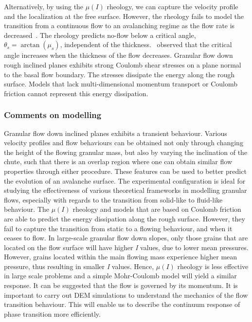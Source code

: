 Alternatively, by using the $\mu(\textit{I})$ rheology, we can capture the 
velocity profile and the localization at the free surface. However, the 
rheology fails to 
model the transition from a continuous flow to an avalanching regime as the 
flow rate is decreased~\citep{Pouliquen2006}. The rheology predicts no-flow 
below a critical angle, $\theta_s = \arctan(\mu_s)$, independent of the 
thickness.~\citet{Pouliquen1999} observed that the critical angle increases 
when the thickness of the flow decreases. Granular 
flow down rough inclined planes exhibits strong Coulomb shear stresses on a 
plane normal to the basal flow boundary. The stresses dissipate the energy 
along the rough surface. Models that lack multi-dimensional momentum transport 
or Coulomb friction cannot represent this energy dissipation.

\subsubsection{Comments on modelling}

Granular flow down inclined planes exhibits a transient behaviour. Various 
velocity profiles and flow behaviours can be obtained not only through changing 
the height of the flowing granular mass, but also by varying the inclination of 
the chute, such that there is an overlap region where one can obtain similar 
flow properties through either procedure. These features can be used to better 
predict the evolution of an avalanche surface. The experimental configuration 
is ideal for studying the effectiveness of various theoretical frameworks in 
modelling granular flows, especially with regards to the transition from 
solid-like to fluid-like behaviour. The $\mu(I)$ rheology and models 
that are based on Coulomb friction are able to predict the energy dissipation 
along the rough surface. However, they fail to capture the transition from 
static to a flowing behaviour, and when it ceases to flow. 
In large-scale granular flow down slopes, only those grains that are
located on the flow surface will have higher \textit{I} values, due to lower 
mean pressures. However, grains located within the main flowing mass  
experience higher mean pressure, thus resulting in smaller \textit{I} 
values. Hence, $\mu(I)$ rheology is less effective in large scale problems and 
a simple Mohr-Coulomb model will yield a similar response. It can be 
suggested that the flow is governed by its momentum. It is 
important to carry out DEM simulations to understand the mechanics of the flow 
transition behaviour. This will enable us to describe the continuum response of 
phase transition more efficiently.


